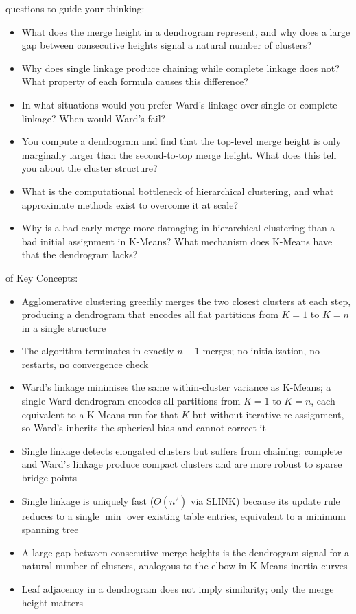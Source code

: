  questions to guide your thinking:
\begin{itemize}
    \item What does the merge height in a dendrogram represent, and why does a large gap between consecutive heights signal a natural number of clusters?
    \item Why does single linkage produce chaining while complete linkage does not? What property of each formula causes this difference?
    \item In what situations would you prefer Ward's linkage over single or complete linkage? When would Ward's fail?
    \item You compute a dendrogram and find that the top-level merge height is only marginally larger than the second-to-top merge height. What does this tell you about the cluster structure?
    \item What is the computational bottleneck of hierarchical clustering, and what approximate methods exist to overcome it at scale?
    \item Why is a bad early merge more damaging in hierarchical clustering than a bad initial assignment in K-Means? What mechanism does K-Means have that the dendrogram lacks?
\end{itemize}

 of Key Concepts:
\begin{itemize}
    \item Agglomerative clustering greedily merges the two closest clusters at each step, producing a dendrogram that encodes all flat partitions from $K{=}1$ to $K{=}n$ in a single structure
    \item The algorithm terminates in exactly $n{-}1$ merges; no initialization, no restarts, no convergence check
    \item Ward's linkage minimises the same within-cluster variance as K-Means; a single Ward dendrogram encodes all partitions from $K{=}1$ to $K{=}n$, each equivalent to a K-Means run for that $K$ but without iterative re-assignment, so Ward's inherits the spherical bias and cannot correct it
    \item Single linkage detects elongated clusters but suffers from chaining; complete and Ward's linkage produce compact clusters and are more robust to sparse bridge points
    \item Single linkage is uniquely fast ($O(n^2)$ via SLINK) because its update rule reduces to a single $\min$ over existing table entries, equivalent to a minimum spanning tree
    \item A large gap between consecutive merge heights is the dendrogram signal for a natural number of clusters, analogous to the elbow in K-Means inertia curves
    \item Leaf adjacency in a dendrogram does not imply similarity; only the merge height matters
\end{itemize}



